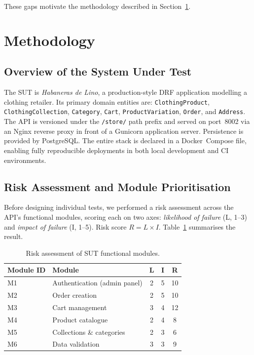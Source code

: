 \documentclass[12pt, a4paper]{article}
\begin{document}
These gaps motivate the methodology described in Section~\ref{sec:methodology}.

\section{Methodology}
\label{sec:methodology}

\subsection{Overview of the System Under Test}
\label{sec:sut}

The SUT is \textit{Habaneras de Lino}, a production-style DRF application
modelling a clothing retailer.  Its primary domain entities are:
\texttt{ClothingProduct}, \texttt{ClothingCollection}, \texttt{Category},
\texttt{Cart}, \texttt{ProductVariation}, \texttt{Order}, and
\texttt{Address}.  The API is versioned under the \texttt{/store/} path prefix
and served on port~8002 via an Nginx reverse proxy in front of a Gunicorn
application server.  Persistence is provided by PostgreSQL.  The entire stack is
declared in a Docker~Compose file, enabling fully reproducible deployments in
both local development and CI environments.

\subsection{Risk Assessment and Module Prioritisation}
\label{sec:risk}

Before designing individual tests, we performed a risk assessment across the
API's functional modules, scoring each on two axes: \textit{likelihood of
failure} (L, 1--3) and \textit{impact of failure} (I, 1--5).  Risk score
$R = L \times I$.  Table~\ref{tab:risk} summarises the result.

\begin{table}[ht]
\centering
\caption{Risk assessment of SUT functional modules.}
\label{tab:risk}
\begin{tabular}{llccc}
\toprule
\textbf{Module ID} & \textbf{Module} & \textbf{L} & \textbf{I} & \textbf{R} \\
\midrule
M1 & Authentication (admin panel) & 2 & 5 & 10 \\
M2 & Order creation                & 2 & 5 & 10 \\
M3 & Cart management               & 3 & 4 & 12 \\
M4 & Product catalogue             & 2 & 4 &  8 \\
M5 & Collections \& categories     & 2 & 3 &  6 \\
M6 & Data validation               & 3 & 3 &  9 \\
\bottomrule
\end{tabular}
\end{table}
\end{document}
